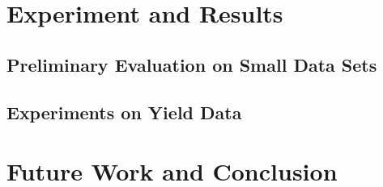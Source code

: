\documentclass[11pt]{article}
\begin{document}
\section{Experiment and Results}

\subsection{Preliminary Evaluation on Small Data Sets}






\subsection{Experiments on Yield Data}








\section{Future Work and Conclusion}






\end{document}
